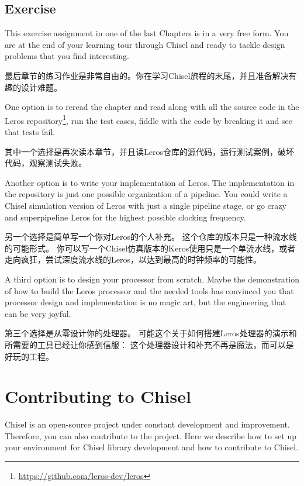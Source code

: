 \documentclass[%
    10pt,
    headinclude, footexclude,
    openright, %
    notitlepage,
    cleardoubleempty,
    headsepline,
    pointlessnumbers,
    bibtotoc, idxtotoc,
    ]{scrbook}
\newcommand{\myref}[2]{\href{#1}{#2}}
\renewcommand{\myref}[2]{{#2}{\footnote{\url{#1}}}}
\begin{document}

\section{Exercise}

This exercise assignment in one of the last Chapters is in a very free form. You are at the end
of your learning tour through Chisel and ready to tackle design problems that
you find interesting.

最后章节的练习作业是非常自由的。你在学习Chisel旅程的末尾，并且准备解决有趣的设计难题。

One option is to reread the chapter and read along with all the source code in the
\myref{https://github.com/leros-dev/leros}{Leros repository}, run the test cases,
fiddle with the code by breaking it and see that tests fail.

其中一个选择是再次读本章节，并且读Leros仓库的源代码，运行测试案例，破坏代码，观察测试失败。

Another option is to write your implementation of Leros.
The implementation in the repository is just one possible organization of a pipeline.
You could write a Chisel simulation version of Leros with just a single pipeline stage,
or go crazy and superpipeline Leros for the highest possible clocking frequency.

另一个选择是简单写一个你对Leros的个人补充。
这个仓库的版本只是一种流水线的可能形式。
你可以写一个Chisel仿真版本的Keros使用只是一个单流水线，或者走向疯狂，尝试深度流水线的Leros，以达到最高的时钟频率的可能性。


A third option is to design your processor from scratch. Maybe the demonstration of
how to build the Leros processor and the needed tools has convinced you that processor
design and implementation is no magic art, but the engineering that can be very joyful.

第三个选择是从零设计你的处理器。
可能这个关于如何搭建Leros处理器的演示和所需要的工具已经让你感到信服：
这个处理器设计和补充不再是魔法，而可以是好玩的工程。

\chapter{Contributing to Chisel}

Chisel is an open-source project under constant development and improvement.
Therefore, you can also contribute to the project. Here we describe how to
set up your environment for Chisel library development and how to contribute
to Chisel.
\end{document}
